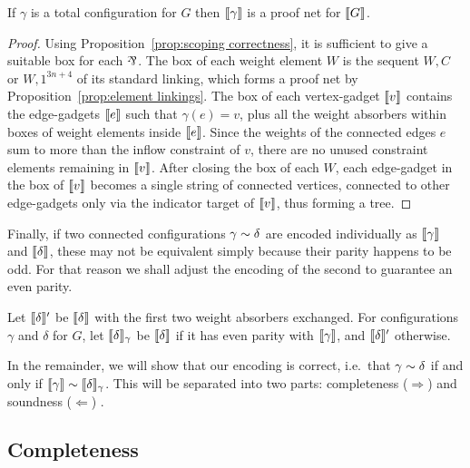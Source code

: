 \documentclass{lmcs}
\begin{document}
\begin{proposition}
If $\gamma$ is a total configuration for $G$ then $\llbracket\gamma\rrbracket$ is a proof net for $\llbracket G\rrbracket$.
\end{proposition}

\begin{proof}
Using Proposition~\ref{prop:scoping correctness}, it is sufficient to give a suitable box for each $\pr$. 
%
The box of each weight element $W$ is the sequent $W,C$ or $W,1^{3n+4}$ of its standard linking, which forms a proof net by Proposition~\ref{prop:element linkings}.
%
The box of each vertex-gadget $\llbracket v\rrbracket$ contains the edge-gadgets $\llbracket e\rrbracket$ such that $\gamma(e)=v$, plus all the weight absorbers within boxes of weight elements inside $\llbracket e\rrbracket$.
%
Since the weights of the connected edges $e$ sum to more than the inflow constraint of $v$, there are no unused constraint elements remaining in $\llbracket v\rrbracket$.
%
After closing the box of each $W$, each edge-gadget in the box of $\llbracket v\rrbracket$ becomes a single string of connected vertices, connected to other edge-gadgets only via the indicator target of $\llbracket v\rrbracket$, thus forming a tree.
\end{proof}





Finally, if two connected configurations $\gamma\perm\delta$ are encoded individually as $\llbracket\gamma\rrbracket$ and $\llbracket\delta\rrbracket$, these may not be equivalent simply because their parity happens to be odd.
%
For that reason we shall adjust the encoding of the second to guarantee an even parity.


\begin{definition}
%
Let $\llbracket\delta\rrbracket'$ be $\llbracket\delta\rrbracket$ with the first two weight absorbers exchanged.
%
For configurations $\gamma$ and $\delta$ for $G$, let $\llbracket\delta\rrbracket_\gamma$ be $\llbracket\delta\rrbracket$ if it has even parity with $\llbracket\gamma\rrbracket$, and $\llbracket\delta\rrbracket'$ otherwise.
%
\end{definition}


In the remainder, we will show that our encoding is correct, i.e.\ that $\gamma\perm\delta$ if and only if $\itn\gamma\perm\itn\delta_\gamma$.
%
This will be separated into two parts: completeness ($\Rightarrow$) and soundness ($\Leftarrow$) .






\subsection*{Completeness}
\end{document}
